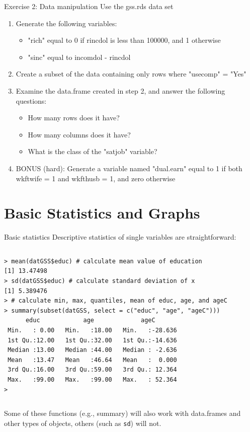 \documentclass[table,smaller]{beamer}
\begin{document}
\begin{frame}[label=sec-6-7]{Exercise 2: Data manipulation}
Use the gss.rds data set

\begin{enumerate}
\item Generate the following variables:
\begin{itemize}
\item "rich" equal to 0 if rincdol is less than 100000, and 1 otherwise
\item "sinc" equal to incomdol - rincdol
\end{itemize}
\item Create a subset of the data containing only rows where "usecomp" = "Yes"
\item Examine the data.frame created in step 2, and answer the following questions:
\begin{itemize}
\item How many rows does it have?
\item How many columns does it have?
\item What is the class of the "satjob" variable?
\end{itemize}
\item BONUS (hard): Generate a variable named "dual.earn" equal to 1 if both wkftwife = 1 and wkfthusb = 1, and zero otherwise
\end{enumerate}
\end{frame}



\section{Basic Statistics and Graphs}
\label{sec-7}

\begin{frame}[fragile,label=sec-7-1]{Basic statistics}
 Descriptive statistics of single variables are straightforward:
\vspace{-.5em}
\begin{columns}
\begin{block}{}
\begin{verbatim}
> mean(datGSS$educ) # calculate mean value of education
[1] 13.47498
> sd(datGSS$educ) # calculate standard deviation of x
[1] 5.389476
> # calculate min, max, quantiles, mean of educ, age, and ageC
> summary(subset(datGSS, select = c("educ", "age", "ageC")))
      educ            age             ageC        
 Min.   : 0.00   Min.   :18.00   Min.   :-28.636  
 1st Qu.:12.00   1st Qu.:32.00   1st Qu.:-14.636  
 Median :13.00   Median :44.00   Median : -2.636  
 Mean   :13.47   Mean   :46.64   Mean   :  0.000  
 3rd Qu.:16.00   3rd Qu.:59.00   3rd Qu.: 12.364  
 Max.   :99.00   Max.   :99.00   Max.   : 52.364  
>
\end{verbatim}
\end{block}
\end{columns}
\vspace{.5em}


Some of these functions (e.g., summary) will also work with data.frames and other types of objects, others (such as \texttt{sd}) will not.
\end{frame}
\end{document}
